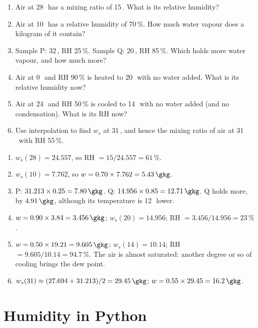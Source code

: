 \begin{tryit}
\begin{enumerate}[label=\textbf{\thechapter.\arabic*},leftmargin=*,itemsep=3pt]
\item Air at 28\,\degC\ has a mixing ratio of 15\,\gkg. What is its relative humidity?
\item Air at 10\,\degC\ has a relative humidity of 70\,\%. How much water vapour does a kilogram of it contain?
\item Sample P: 32\,\degC, RH 25\,\%. Sample Q: 20\,\degC, RH 85\,\%. Which holds more water vapour, and how much more?
\item Air at 0\,\degC\ and RH 90\,\% is heated to 20\,\degC\ with no water added. What is its relative humidity now?
\item Air at 24\,\degC\ and RH 50\,\% is cooled to 14\,\degC\ with no water added (and no condensation). What is its RH now?
\item Use interpolation to find $w_s$ at 31\,\degC, and hence the mixing ratio of air at 31\,\degC\ with RH 55\,\%.
\end{enumerate}
\end{tryit}

\begin{answerbox}
\begin{enumerate}[label=\textbf{\thechapter.\arabic*},leftmargin=*,itemsep=3pt]
\item $w_s(28)=24.557$, so RH $=15/24.557=61\,\%$.
\item $w_s(10)=7.762$, so $w=0.70\times7.762=5.43\,\gkg$.
\item P: $31.213\times0.25=7.80\,\gkg$. Q: $14.956\times0.85=12.71\,\gkg$. Q holds more, by $4.91\,\gkg$, although its temperature is 12\,\degC\ lower.
\item $w=0.90\times3.84=3.456\,\gkg$; $w_s(20)=14.956$; RH $=3.456/14.956=23\,\%$.
\item $w=0.50\times19.21=9.605\,\gkg$; $w_s(14)=10.14$; RH $=9.605/10.14=94.7\,\%$. The air is almost saturated: another degree or so of cooling brings the dew point.
\item $w_s(31)\approx(27.694+31.213)/2=29.45\,\gkg$; $w=0.55\times29.45=16.2\,\gkg$.
\end{enumerate}
\end{answerbox}

\section{Humidity in Python}

